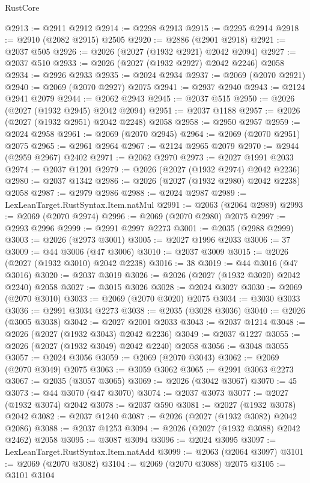 \begin{lexlean}{RustCore}
\begin{coremodule}
@2913 := @2911 @2912
@2914 := @2298 @2913
@2915 := @2295 @2914
@2918 := @2910 (@2082 @2915) @2505
@2920 := @2886 (@2901 @2918)
@2921 := @2037 @505
@2926 := @2026 (@2027 (@1932 @2921) @2042 @2094)
@2927 := @2037 @510
@2933 := @2026 (@2027 (@1932 @2927) @2042 @2246) @2058
@2934 := @2926 @2933
@2935 := @2024 @2934
@2937 := @2069 (@2070 @2921)
@2940 := @2069 (@2070 @2927) @2075
@2941 := @2937 @2940
@2943 := @2124 @2941 @2079
@2944 := @2062 @2943
@2945 := @2037 @515
@2950 := @2026 (@2027 (@1932 @2945) @2042 @2094)
@2951 := @2037 @1188
@2957 := @2026 (@2027 (@1932 @2951) @2042 @2248) @2058
@2958 := @2950 @2957
@2959 := @2024 @2958
@2961 := @2069 (@2070 @2945)
@2964 := @2069 (@2070 @2951) @2075
@2965 := @2961 @2964
@2967 := @2124 @2965 @2079
@2970 := @2944 (@2959 @2967) @2402
@2971 := @2062 @2970
@2973 := @2027 @1991 @2033
@2974 := @2037 @1201
@2979 := @2026 (@2027 (@1932 @2974) @2042 @2236)
@2980 := @2037 @1342
@2986 := @2026 (@2027 (@1932 @2980) @2042 @2238) @2058
@2987 := @2979 @2986
@2988 := @2024 @2987
@2989 := LexLeanTarget.RustSyntax.Item.natMul
@2991 := @2063 (@2064 @2989)
@2993 := @2069 (@2070 @2974)
@2996 := @2069 (@2070 @2980) @2075
@2997 := @2993 @2996
@2999 := @2991 @2997 @2273
@3001 := @2035 (@2988 @2999)
@3003 := @2026 (@2973 @3001)
@3005 := @2027 @1996 @2033
@3006 := 37
@3009 := @44 @3006 (@47 @3006)
@3010 := @2037 @3009
@3015 := @2026 (@2027 (@1932 @3010) @2042 @2238)
@3016 := 38
@3019 := @44 @3016 (@47 @3016)
@3020 := @2037 @3019
@3026 := @2026 (@2027 (@1932 @3020) @2042 @2240) @2058
@3027 := @3015 @3026
@3028 := @2024 @3027
@3030 := @2069 (@2070 @3010)
@3033 := @2069 (@2070 @3020) @2075
@3034 := @3030 @3033
@3036 := @2991 @3034 @2273
@3038 := @2035 (@3028 @3036)
@3040 := @2026 (@3005 @3038)
@3042 := @2027 @2001 @2033
@3043 := @2037 @1214
@3048 := @2026 (@2027 (@1932 @3043) @2042 @2236)
@3049 := @2037 @1227
@3055 := @2026 (@2027 (@1932 @3049) @2042 @2240) @2058
@3056 := @3048 @3055
@3057 := @2024 @3056
@3059 := @2069 (@2070 @3043)
@3062 := @2069 (@2070 @3049) @2075
@3063 := @3059 @3062
@3065 := @2991 @3063 @2273
@3067 := @2035 (@3057 @3065)
@3069 := @2026 (@3042 @3067)
@3070 := 45
@3073 := @44 @3070 (@47 @3070)
@3074 := @2037 @3073
@3077 := @2027 (@1932 @3074) @2042
@3078 := @2037 @590
@3081 := @2027 (@1932 @3078) @2042
@3082 := @2037 @1240
@3087 := @2026 (@2027 (@1932 @3082) @2042 @2086)
@3088 := @2037 @1253
@3094 := @2026 (@2027 (@1932 @3088) @2042 @2462) @2058
@3095 := @3087 @3094
@3096 := @2024 @3095
@3097 := LexLeanTarget.RustSyntax.Item.natAdd
@3099 := @2063 (@2064 @3097)
@3101 := @2069 (@2070 @3082)
@3104 := @2069 (@2070 @3088) @2075
@3105 := @3101 @3104

\end{coremodule}
\end{lexlean}
